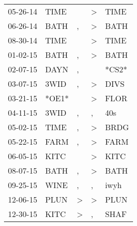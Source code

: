 \begin{supertabular}{p{0.07\textwidth}p{0.06\textwidth}p{0.02\textwidth}p{0.02\textwidth}p{0.06\textwidth}}
 05-26-14\textsuperscript{} &  TIME\textsuperscript{} &                  &     \textgreater &           TIME\textsuperscript{} \\
 06-26-14\textsuperscript{} &  BATH\textsuperscript{} &                , &     \textgreater &           BATH\textsuperscript{} \\
 08-30-14\textsuperscript{} &  TIME\textsuperscript{} &                  &     \textgreater &           TIME\textsuperscript{} \\
 01-02-15\textsuperscript{} &  BATH\textsuperscript{} &                , &     \textgreater &           BATH\textsuperscript{} \\
 02-07-15\textsuperscript{} &  DAYN\textsuperscript{} &                , &                  &                            *CS2* \\
 03-07-15\textsuperscript{} &  3WID\textsuperscript{} &                , &     \textgreater &           DIVS\textsuperscript{} \\
 03-21-15\textsuperscript{} &                   *OE1* &                  &     \textgreater &           FLOR\textsuperscript{} \\
 04-11-15\textsuperscript{} &  3WID\textsuperscript{} &                , &                , &            40s\textsuperscript{} \\
 05-02-15\textsuperscript{} &  TIME\textsuperscript{} &                , &     \textgreater &           BRDG\textsuperscript{} \\
 05-22-15\textsuperscript{} &  FARM\textsuperscript{} &                , &     \textgreater &           FARM\textsuperscript{} \\
 06-05-15\textsuperscript{} &  KITC\textsuperscript{} &                  &     \textgreater &           KITC\textsuperscript{} \\
 08-07-15\textsuperscript{} &  BATH\textsuperscript{} &                , &     \textgreater &           BATH\textsuperscript{} \\
 09-25-15\textsuperscript{} &  WINE\textsuperscript{} &                , &                , &           iwyh\textsuperscript{} \\
 12-06-15\textsuperscript{} &  PLUN\textsuperscript{} &     \textgreater &     \textgreater &           PLUN\textsuperscript{} \\
 12-30-15\textsuperscript{} &  KITC\textsuperscript{} &     \textgreater &                , &           SHAF\textsuperscript{} \\

\end{supertabular}
